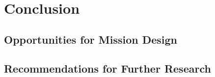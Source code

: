 \chapter{Conclusion}

\section{Opportunities for Mission Design}

\section{Recommendations for Further Research}
